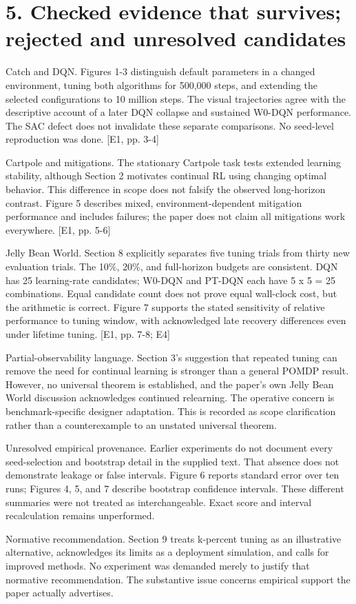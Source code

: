\documentclass[10pt]{article}
\begin{document}
\section*{5. Checked evidence that survives; rejected and unresolved candidates}
Catch and DQN. Figures 1-3 distinguish default parameters in a changed environment, tuning both algorithms for 500,000 steps, and extending the selected configurations to 10 million steps. The visual trajectories agree with the descriptive account of a later DQN collapse and sustained W0-DQN performance. The SAC defect does not invalidate these separate comparisons. No seed-level reproduction was done. [E1, pp. 3-4]\par
Cartpole and mitigations. The stationary Cartpole task tests extended learning stability, although Section 2 motivates continual RL using changing optimal behavior. This difference in scope does not falsify the observed long-horizon contrast. Figure 5 describes mixed, environment-dependent mitigation performance and includes failures; the paper does not claim all mitigations work everywhere. [E1, pp. 5-6]\par
Jelly Bean World. Section 8 explicitly separates five tuning trials from thirty new evaluation trials. The 10\%, 20\%, and full-horizon budgets are consistent. DQN has 25 learning-rate candidates; W0-DQN and PT-DQN each have 5 x 5 = 25 combinations. Equal candidate count does not prove equal wall-clock cost, but the arithmetic is correct. Figure 7 supports the stated sensitivity of relative performance to tuning window, with acknowledged late recovery differences even under lifetime tuning. [E1, pp. 7-8; E4]\par
Partial-observability language. Section 3’s suggestion that repeated tuning can remove the need for continual learning is stronger than a general POMDP result. However, no universal theorem is established, and the paper’s own Jelly Bean World discussion acknowledges continued relearning. The operative concern is benchmark-specific designer adaptation. This is recorded as scope clarification rather than a counterexample to an unstated universal theorem.\par
Unresolved empirical provenance. Earlier experiments do not document every seed-selection and bootstrap detail in the supplied text. That absence does not demonstrate leakage or false intervals. Figure 6 reports standard error over ten runs; Figures 4, 5, and 7 describe bootstrap confidence intervals. These different summaries were not treated as interchangeable. Exact score and interval recalculation remains unperformed.\par
Normative recommendation. Section 9 treats k-percent tuning as an illustrative alternative, acknowledges its limits as a deployment simulation, and calls for improved methods. No experiment was demanded merely to justify that normative recommendation. The substantive issue concerns empirical support the paper actually advertises.\par
\end{document}
